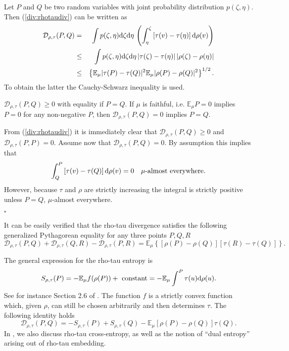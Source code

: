 \documentclass[graybox]{svmult}
\newcommand{\be}{\begin{equation}}
\newcommand{\ee}{\end{equation}}
\newcommand{\beq}{\begin{eqnarray}}
\newcommand{\eeq}{\end{eqnarray}}
\newcommand{\Eo}{\mathbb E}
\newcommand{\Ddiv}{\mathcal{D}}
\newcommand{\beginproof}{\par\strut\vskip 0.0cm\noindent{\bf Proof}\par}
\renewcommand{\endproof}{\par\strut\hfill$\square$\par\vskip 0.2cm}
\newcommand{\upd}{{\rm d}}
\begin{document}
Let $P$ and $Q$ be two random variables with joint probability distribution $p(\zeta,\eta)$.
Then (\ref {div:rhotaudiv}) can be written as
\beq
\Ddiv _{\rho,\tau}(P,Q)&=&\int p(\zeta,\eta)\upd\zeta\upd\eta\,
\left(\int_\eta^\zeta\left[\tau(v)-\tau(\eta)\right]\upd \rho(v)\right)\cr
&\le&
\int p(\zeta,\eta)\upd\zeta\upd\eta\,|\tau(\zeta)-\tau(\eta)|\,|\rho(\zeta)-\rho(\eta)|\cr
&\le&\left\{\Eo_\mu |\tau(P)-\tau(Q)|^2\Eo_\mu|\rho(P)-\rho(Q)|^2\right\}^{1/2}.
\eeq
To obtain the latter the Cauchy-Schwarz inequality is used.

\begin{theorem}
$\Ddiv _{\rho,\tau}(P,Q)\ge 0$ with equality if $P=Q$.
If $\mu$ is faithful, i.e. $\Eo_\mu P=0$ implies $P=0$ for any non-negative $P$, then
$\Ddiv _{\rho,\tau}(P,Q)=0$ implies $P=Q$.
\end{theorem}

\beginproof

From (\ref {div:rhotaudiv}) it is immediately clear that $\Ddiv _{\rho,\tau}(P,Q)\ge 0$
and $\Ddiv _{\rho,\tau}(P,P)=0$.
Assume now that $\Ddiv _{\rho,\tau}(P,Q)=0$. 
By assumption this implies that
\be
\int_Q^P\left[\tau(v)-\tau(Q)\right]\upd \rho(v)=0\quad\mu\mbox{-almost everywhere}.
\nonumber
\ee
However, because $\tau$ and $\rho$ are strictly increasing the integral is strictly positive unless
$P=Q$, $\mu$-almost everywhere.
\endproof

It can be easily verified that the rho-tau divergence satisfies the following generalized 
Pythagorean equality for any three points $P,Q,R$
$$
\Ddiv _{\rho,\tau}(P,Q) + \Ddiv _{\rho,\tau}(Q,R) - \Ddiv _{\rho,\tau}(P,R) = \Eo_\mu \left\{ [\rho(P) - \rho(Q)] [ \tau(R) - \tau(Q)]    \right\} .
$$

The general expression for the rho-tau entropy is
\be
S_{\rho,\tau}(P)=-\Eo_\mu f(\rho(P))+\mbox{ constant}
=-\Eo_\mu\int^P\tau(u)\upd\rho(u).
\ee
See for instance Section 2.6 of \cite{ZN17}. The function $f$ is a strictly convex function
which, given $\rho$, can still be chosen arbitrarily and then determines $\tau$.
The following identity holds
\be
\Ddiv _{\rho,\tau}(P,Q)=
-S_{\rho,\tau}(P)+S_{\rho,\tau}(Q)-\Eo_\mu\left[\rho(P)-\rho(Q)\right]\tau(Q).
\label{div:ent}
\ee
In \cite{ZN17, NZ18}, we also discuss rho-tau cross-entropy, as well as the notion of ``dual entropy'' arising out of rho-tau embedding. 
\end{document}
